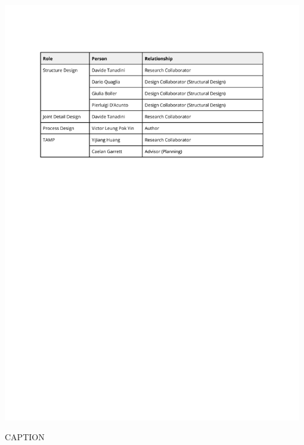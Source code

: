 \begin{table}[!h]
    \includegraphics[page=1, trim=25.4mm 180mm 25.4mm 33mm, clip, width=0.98\textwidth]{tables/Tables in Chapter 8.pdf}
    \caption{CAPTION}
    \label{table:LABELTEXT}
\end{table}


